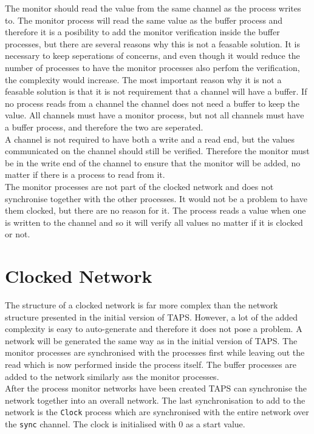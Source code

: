 The monitor should read the value from the same channel as the process writes to. The monitor process will read the same value as the buffer process and therefore it is a posibility to add the monitor verification inside the buffer processes, but there are several reasons why this is not a feasable solution. It is necessary to keep seperations of concerns, and even though it would reduce the number of processes to have the monitor processes also perfom the verification, the complexity would increase. The most important reason why it is not a feasable solution is that it is not requirement that a channel will have a buffer. If no process reads from a channel the channel does not need a buffer to keep the value. All channels must have a monitor process, but not all channels must have a buffer process, and therefore the two are seperated.\\

A channel is not required to have both a write and a read end, but the values communicated on the channel should still be verified. Therefore the monitor must be in the write end of the channel to ensure that the monitor will be added, no matter if there is a process to read from it. \\

The monitor processes are not part of the clocked network and does not synchronise together with the other processes. It would not be a problem to have them clocked, but there are no reason for it. The process reads a value when one is written to the channel and so it will verify all values no matter if it is clocked or not.

\section{Clocked Network}
The structure of a clocked network is far more complex than the network structure presented in the initial version of TAPS. However, a lot of the added complexity is easy to auto-generate and therefore it does not pose a problem. A network will be generated the same way as in the initial version of TAPS. The monitor processes are synchronised with the processes first while leaving out the read which is now performed inside the process itself. The buffer processes are added to the network similarly ass the monitor processes. \\

After the process monitor networks have been created TAPS can synchronise the network together into an overall network.
The last synchronisation to add to the network is the \texttt{Clock} process which are synchronised with the entire network over the \texttt{sync} channel. The clock is initialised with 0 as a start value.


